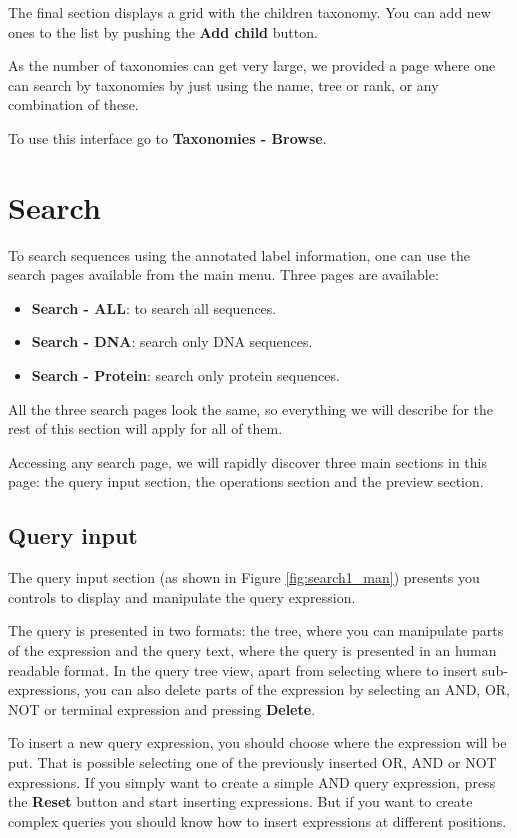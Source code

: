 The final section displays a grid with the children taxonomy. You can add new ones to the list by pushing
the \textbf{Add child} button.

As the number of taxonomies can get very large, we provided a page where one can search by taxonomies
by just using the name, tree or rank, or any combination of these.

To use this interface go to \textbf{Taxonomies - Browse}.

\section{Search}

To search sequences using the annotated label information, one can use the search pages available
from the main menu. Three pages are available:

\begin{itemize}
  \item \textbf{Search - ALL}: to search all sequences.
  \item \textbf{Search - DNA}: search only DNA sequences.
  \item \textbf{Search - Protein}: search only protein sequences.
\end{itemize}

All the three search pages look the same, so everything we will describe for the rest
of this section will apply for all of them.

Accessing any search page, we will rapidly discover three main sections in this page:
the query input section, the operations section and the preview section.

\subsection{Query input}

The query input section (as shown in Figure \ref{fig:search1_man}) presents you controls
to display and manipulate the query expression.

The query is presented in two formats: the tree, where you can manipulate parts of the expression
and the query text, where the query is presented in an human readable format. In the query tree view,
apart from selecting where to insert sub-expressions, you can also delete parts of the expression by
selecting an AND, OR, NOT or terminal expression and pressing \textbf{Delete}.

To insert a new query expression, you should choose where the expression will be put. That is possible
selecting one of the previously inserted OR, AND or NOT expressions. If you simply want
to create a simple AND query expression, press the \textbf{Reset} button and start
inserting expressions. But if you want to create complex queries you should know how to
insert expressions at different positions.


